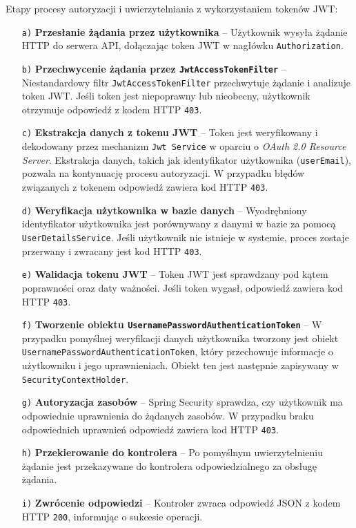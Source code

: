 \noindent Etapy procesy autoryzacji i uwierzytelniania z wykorzystaniem tokenów JWT:
\begin{enumerate}
    \item[\texttt{a)}] \textbf{Przesłanie żądania przez użytkownika} -- Użytkownik wysyła żądanie HTTP do serwera API, dołączając token JWT w nagłówku \texttt{Authorization}.
    
    \item[\texttt{b)}] \textbf{Przechwycenie żądania przez \texttt{JwtAccessTokenFilter}} -- Niestandardowy filtr \texttt{JwtAccessTokenFilter} przechwytuje żądanie i analizuje token JWT. Jeśli token jest niepoprawny lub nieobecny, użytkownik otrzymuje odpowiedź z kodem HTTP \texttt{403}.
    
    \item[\texttt{c)}] \textbf{Ekstrakcja danych z tokenu JWT} -- Token jest weryfikowany i dekodowany przez mechanizm \texttt{Jwt Service} w oparciu o \emph{OAuth 2.0 Resource Server}. Ekstrakcja danych, takich jak identyfikator użytkownika (\texttt{userEmail}), pozwala na kontynuację procesu autoryzacji. W przypadku błędów związanych z tokenem odpowiedź zawiera kod HTTP \texttt{403}.
    
    \item[\texttt{d)}] \textbf{Weryfikacja użytkownika w bazie danych} -- Wyodrębniony identyfikator użytkownika jest porównywany z danymi w bazie za pomocą \texttt{UserDetailsService}. Jeśli użytkownik nie istnieje w systemie, proces zostaje przerwany i zwracany jest kod HTTP \texttt{403}.
    
    \item[\texttt{e)}] \textbf{Walidacja tokenu JWT} -- Token JWT jest sprawdzany pod kątem poprawności oraz daty ważności. Jeśli token wygasł, odpowiedź zawiera kod HTTP \texttt{403}.
    
    \item[\texttt{f)}] \textbf{Tworzenie obiektu \texttt{UsernamePasswordAuthenticationToken}} -- W przypadku pomyślnej weryfikacji danych użytkownika tworzony jest obiekt \texttt{UsernamePasswordAuthenticationToken}, który przechowuje informacje o użytkowniku i jego uprawnieniach. Obiekt ten jest następnie zapisywany w \texttt{SecurityContextHolder}.
    
    \item[\texttt{g)}] \textbf{Autoryzacja zasobów} -- Spring Security sprawdza, czy użytkownik ma odpowiednie uprawnienia do żądanych zasobów. W przypadku braku odpowiednich uprawnień odpowiedź zawiera kod HTTP \texttt{403}.
    
    \item[\texttt{h)}] \textbf{Przekierowanie do kontrolera} -- Po pomyślnym uwierzytelnieniu żądanie jest przekazywane do kontrolera odpowiedzialnego za obsługę żądania.
    
    \item[\texttt{i)}] \textbf{Zwrócenie odpowiedzi} -- Kontroler zwraca odpowiedź JSON z kodem HTTP \texttt{200}, informując o sukcesie operacji.
\end{enumerate}

